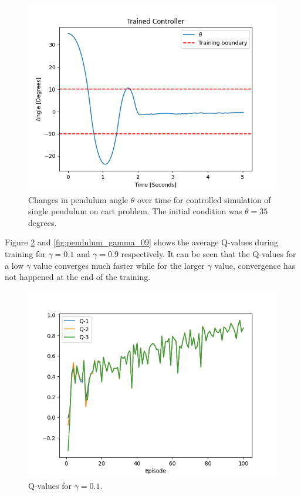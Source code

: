 \documentclass[final]{LTHtwocol} %
\begin{document}
\begin{figure}[htp]
	\centering
	\includegraphics[width=0.9\columnwidth]{figures/Pendulum_angle_35.png}
	\caption{Changes in pendulum angle $\theta$ over time for controlled simulation of single pendulum on cart problem. The initial condition was $\theta = 35$ degrees.}
	\label{fig:single_pendulum_outside_training_domain}
\end{figure}
Figure \ref{fig:pendulum_gamma_01} and \ref{fig:pendulum_gamma_09} shows the average Q-values during training for $\gamma=0.1$ and $\gamma=0.9$ respectively. It can be seen that the Q-values for a low $\gamma$ value converges much faster while for the larger $\gamma$ value, convergence has not happened at the end of the training.
\begin{figure}[htp]
	\centering
	\includegraphics[width=0.9\columnwidth]{figures/Pendulum_q_gamma_01.png}
	\caption{Q-values for $\gamma=0.1$.}
	\label{fig:pendulum_gamma_01}
\end{figure} 
\end{document}
